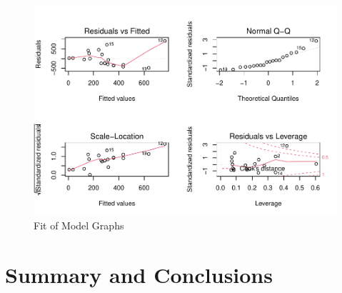 \documentclass[
  12pt,
]{article}
\begin{document}
\begin{figure}
\centering
\includegraphics{Alexander_ENV872_Project_files/figure-latex/regression-1.pdf}
\caption{Fit of Model Graphs}
\end{figure}

\newpage

\hypertarget{summary-and-conclusions}{%
\section{Summary and Conclusions}\label{summary-and-conclusions}}
\end{document}
